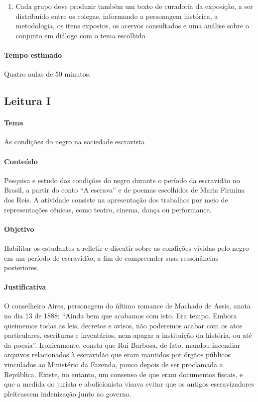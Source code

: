 \documentclass[12pt]{extarticle}
\begin{document}
\begin{enumerate}
\item
Cada grupo deve produzir também um texto de curadoria da exposição, a
ser distribuído entre os colegas, informando a personagem histórica, a
metodologia, os itens expostos, os acervos consultados e uma análise
sobre o conjunto em diálogo com o tema escolhido.
\end{enumerate}

\paragraph{Tempo estimado} Quatro aulas de 50 minutos.

\subsection{Leitura I}

\paragraph{Tema} As condições do negro na sociedade escravista
  

\paragraph{Conteúdo} Pesquisa e estudo das condições do negro durante o
período da escravidão no Brasil, a partir do conto ``A escrava'' e de
poemas escolhidos de Maria Firmina dos Reis. A atividade consiste na
apresentação dos trabalhos por meio de representações cênicas, como
teatro, cinema, dança ou performance.

\paragraph{Objetivo} Habilitar os estudantes a refletir e discutir sobre
as condições vividas pelo negro em um período de escravidão, a fim de
compreender suas ressonâncias posteriores.

\paragraph{Justificativa} O conselheiro Aires, personagem do último
romance de Machado de Assis, anota no dia 13 de 1888: ``Ainda bem que
acabamos com isto. Era tempo. Embora queimemos todas as leis, decretos e
avisos, não poderemos acabar com os atos particulares, escrituras e
inventários, nem apagar a instituição da história, ou até da poesia''.
Ironicamente, consta que Rui Barbosa, de fato, mandou incendiar arquivos
relacionados à escravidão que eram mantidos por órgãos públicos
vinculados ao Ministério da Fazenda, pouco depois de ser proclamada a
República. Existe, no entanto, um consenso de que eram documentos
fiscais, e que a medida do jurista e abolicionista visava evitar que os
antigos escravizadores pleiteassem indenização junto ao governo.
\end{document}
